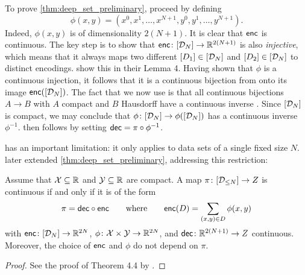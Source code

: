 \documentclass[12pt, twoside]{report}
\begin{document}
To prove \cref{thm:deep_set_preliminary}, \citeauthor{Zaheer:2017:Deep_Sets} proceed by defining
\begin{equation} \label{eq:power_series}
    \phi(x, y) =
    (
        x^0, x^1, \ldots, x^{N + 1},
        y^0, y^1, \ldots, y^{N + 1}
    ).
\end{equation}
Indeed, $\phi(x, y)$ is of dimensionality $2(N + 1)$.
It is clear that $\enc$ is continuous.
The key step is to show that $\enc\colon[\D_N] \to \R^{2(N+1)}$ is also \emph{injective}, which means that
it always maps two different $[D_1] \in [\D_N]$ and $[D_2] \in [\D_N]$ to distinct encodings.
\citeauthor{Zaheer:2017:Deep_Sets} show this in their Lemma 4.
Having shown that $\phi$ is a continuous injection, it follows that it is a continuous bijection from onto its image $\enc([\D_N])$.
The fact that we now use is that all continuous bijections $A \to B$ with $A$ compact and $B$ Hausdorff have a continuous inverse \parencite[Theorem 26.6;][]{Munkres:2000:Topology}. 
Since $[\D_N]$ is compact, we may conclude that $\phi\colon [\D_N] \to \phi([\D_N])$ has a continuous inverse $\phi^{-1}$.
 then follows by setting $\dec = \pi \comp \phi^{-1}$.

 has an important limitation: 
it only applies to data sets of a single fixed size $N$.
\citeauthor{Wagstaff:2019:On_the_Limitations_of_Representing} later extended \cref{thm:deep_set_preliminary}, addressing this restriction:

\begin{theorem} \label{thm:deep_set}
    Assume that $\X \sub \R$ and $\Y \sub \R$ are compact.
    A map $\pi \colon [\D_{\le N}] \to Z$ is continuous if and only if it is of the form
    \begin{equation} \label{eq:deep_set}
        \pi = \dec \comp \enc \qquad \text{where} \qquad \enc(D) = \sum_{\smash{(x, y) \in D}} \phi(x, y)
    \end{equation}
    with $\enc \colon [\D_N] \to \smash{\R^{2N}}$,
    $\phi\colon \X \times \Y \to \smash{\R^{2N}}$, and
    $\dec \colon \smash{\R^{2(N+1)}} \to Z$ continuous.
    Moreover, the choice of $\enc$ and $\phi$ do not depend on $\pi$.
\end{theorem}
\begin{proof}
    See the proof of Theorem 4.4 by \textcite{Wagstaff:2019:On_the_Limitations_of_Representing}.
\end{proof}
\end{document}
